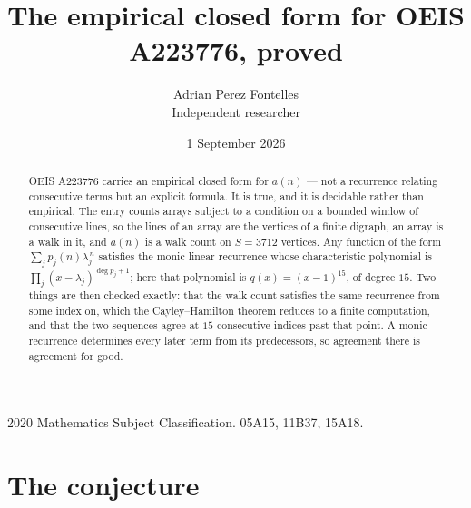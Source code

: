 \documentclass[11pt,a4paper]{article}
\title{The empirical closed form for OEIS A223776, proved}
\author{Adrian Perez Fontelles\\ \small Independent researcher}
\date{1 September 2026}
\theoremstyle{plain}
\theoremstyle{definition}
\begin{document}
\maketitle

\begin{abstract}
OEIS A223776 carries an empirical closed form for $a(n)$ --- not a recurrence relating
consecutive terms but an explicit formula. It is true, and it is decidable rather than
empirical. The entry counts arrays subject to a condition on a bounded window of consecutive lines, so the lines of an array are the
vertices of a finite digraph, an array is a walk in it, and $a(n)$ is a walk count on
$S=3712$ vertices. Any function of the form $\sum_j p_j(n)\lambda_j^{\,n}$ satisfies the
monic linear recurrence whose characteristic polynomial is
$\prod_j(x-\lambda_j)^{\deg p_j+1}$; here that polynomial is $q(x)=(x-1)^{15}$, of degree
$15$. Two things are then checked exactly: that the walk count satisfies the same
recurrence from some index on, which the Cayley--Hamilton theorem reduces to a finite
computation, and that the two sequences agree at $15$ consecutive indices past that
point. A monic recurrence determines every later term from its predecessors, so agreement
there is agreement for good.
\end{abstract}

\noindent\small 2020 Mathematics Subject Classification. 05A15, 11B37, 15A18.\normalsize

\section{The conjecture}
\end{document}

